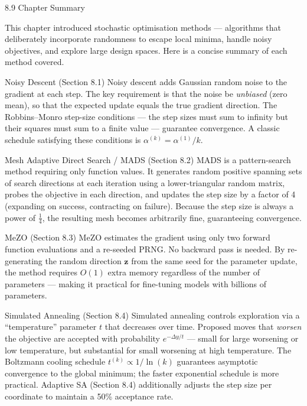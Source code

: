 \documentclass[aspectratio=169,10pt]{beamer}
\begin{document}
\begin{frame}[allowframebreaks]{8.9 Chapter Summary}

This chapter introduced stochastic optimisation methods --- algorithms that deliberately incorporate randomness to escape local minima, handle noisy objectives, and explore large design spaces.
Here is a concise summary of each method covered.

\begin{block}{Noisy Descent (Section 8.1)}
Noisy descent adds Gaussian random noise to the gradient at each step. The key requirement is that the noise be \emph{unbiased} (zero mean), so that the expected update equals the true gradient direction. The Robbins--Monro step-size conditions --- the step sizes must sum to infinity but their squares must sum to a finite value --- guarantee convergence. A classic schedule satisfying these conditions is $\alpha^{(k)} = \alpha^{(1)}/k$.
\end{block}

\begin{block}{Mesh Adaptive Direct Search / MADS (Section 8.2)}
MADS is a pattern-search method requiring only function values. It generates random positive spanning sets of search directions at each iteration using a lower-triangular random matrix, probes the objective in each direction, and updates the step size by a factor of 4 (expanding on success, contracting on failure). Because the step size is always a power of $\tfrac{1}{4}$, the resulting mesh becomes arbitrarily fine, guaranteeing convergence.
\end{block}

\begin{block}{MeZO (Section 8.3)}
MeZO estimates the gradient using only two forward function evaluations and a re-seeded PRNG. No backward pass is needed. By re-generating the random direction $\mathbf{z}$ from the same seed for the parameter update, the method requires $O(1)$ extra memory regardless of the number of parameters --- making it practical for fine-tuning models with billions of parameters.
\end{block}

\begin{block}{Simulated Annealing (Section 8.4)}
Simulated annealing controls exploration via a ``temperature'' parameter $t$ that decreases over time. Proposed moves that \emph{worsen} the objective are accepted with probability $e^{-\Delta y / t}$ --- small for large worsening or low temperature, but substantial for small worsening at high temperature. The Boltzmann cooling schedule $t^{(k)} \propto 1/\ln(k)$ guarantees asymptotic convergence to the global minimum; the faster exponential schedule is more practical. Adaptive SA (Section 8.4) additionally adjusts the step size per coordinate to maintain a 50\% acceptance rate.
\end{block}


\end{frame}
\end{document}
